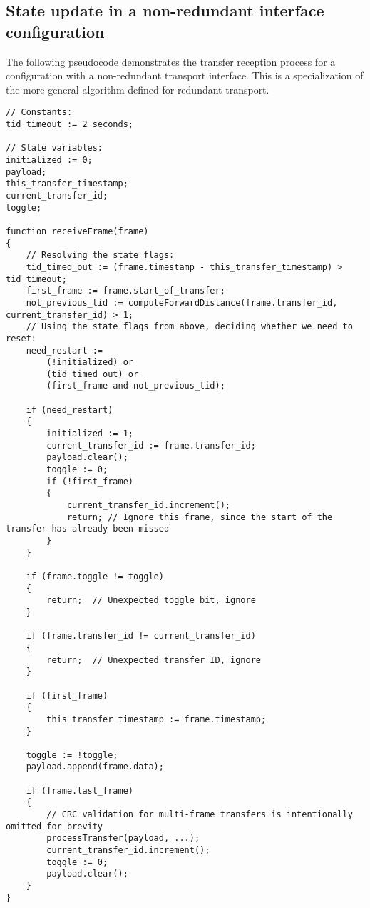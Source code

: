 \clearpage
\subsection{State update in a non-redundant interface configuration}
\label{sec:transfer_reception_state_update_non_redundant}

The following pseudocode demonstrates the transfer reception process for a configuration
with a non-redundant transport interface.
This is a specialization of the more general algorithm defined for redundant transport.

\begin{verbatim}
// Constants:
tid_timeout := 2 seconds;

// State variables:
initialized := 0;
payload;
this_transfer_timestamp;
current_transfer_id;
toggle;

function receiveFrame(frame)
{
    // Resolving the state flags:
    tid_timed_out := (frame.timestamp - this_transfer_timestamp) > tid_timeout;
    first_frame := frame.start_of_transfer;
    not_previous_tid := computeForwardDistance(frame.transfer_id, current_transfer_id) > 1;
    // Using the state flags from above, deciding whether we need to reset:
    need_restart :=
        (!initialized) or
        (tid_timed_out) or
        (first_frame and not_previous_tid);

    if (need_restart)
    {
        initialized := 1;
        current_transfer_id := frame.transfer_id;
        payload.clear();
        toggle := 0;
        if (!first_frame)
        {
            current_transfer_id.increment();
            return; // Ignore this frame, since the start of the transfer has already been missed
        }
    }

    if (frame.toggle != toggle)
    {
        return;  // Unexpected toggle bit, ignore
    }

    if (frame.transfer_id != current_transfer_id)
    {
        return;  // Unexpected transfer ID, ignore
    }

    if (first_frame)
    {
        this_transfer_timestamp := frame.timestamp;
    }

    toggle := !toggle;
    payload.append(frame.data);

    if (frame.last_frame)
    {
        // CRC validation for multi-frame transfers is intentionally omitted for brevity
        processTransfer(payload, ...);
        current_transfer_id.increment();
        toggle := 0;
        payload.clear();
    }
}
\end{verbatim}

\clearpage
